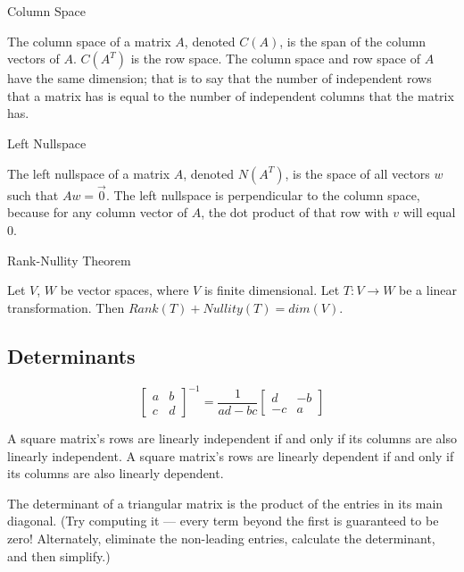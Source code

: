 \begin{mybox}{Column Space}

The column space of a matrix $A$, denoted $C(A)$, is the span of the column vectors of $A$. $C(A^{T})$ is the row space. The column space and row space of $A$ have the same dimension; that is to say that the number of independent rows that a matrix has is equal to the number of independent columns that the matrix has.

\end{mybox}

\begin{mybox}{Left Nullspace}

The left nullspace of a matrix $A$, denoted $N(A^{T})$, is the space of all vectors $w$ such that $Aw=\vec{0}$. The left nullspace is perpendicular to the column space, because for any column vector of $A$, the dot product of that row with $v$ will equal $0$.

\end{mybox}

\begin{mybox}{Rank-Nullity Theorem}

Let $V$, $W$ be vector spaces, where $V$ is finite dimensional. Let $T: V \to W$ be a linear transformation. Then $Rank(T) + Nullity(T) = dim(V)$.

\end{mybox}

\subsection{Determinants}

$$\begin{bmatrix}
a & b\\
c & d
\end{bmatrix}^{-1}
=
\frac{1}{ad-bc}
\begin{bmatrix}
d & -b\\
-c & a
\end{bmatrix}
$$

A square matrix's rows are linearly independent if and only if its columns are also linearly independent. A square matrix's rows are linearly dependent if and only if its columns are also linearly dependent.

The determinant of a triangular matrix is the product of the entries in its main diagonal. (Try computing it — every term beyond the first is guaranteed to be zero! Alternately, eliminate the non-leading entries, calculate the determinant, and then simplify.)

